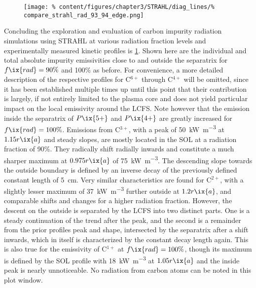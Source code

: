%
        \begin{figure}[t]%
            \centering%
                \texttt{[image: \%
                    content/figures/chapter3/STRAHL/diag\_lines/\%
                    compare\_strahl\_rad\_93\_94\_edge.png]}%
            \label{fig:total_rad_93_94_edge}%
        \end{figure}%
%
        Concluding the exploration and evaluation of carbon impurity radiation simulations using STRAHL at various radiation fraction levels and experimentally measured kinetic profiles is \cref{fig:total_rad_93_94_edge}. Shown here are the individual and total absolute impurity emissivities close to and outside the separatrix for $f\ix{rad}=90\%$ and 100\% as before. For convenience, a more detailed description of the respective profiles for C$^{6+}$ through C$^{4+}$ will be omitted, since it has been established multiple times up until this point that their contribution is largely, if not entirely limited to the plasma core and does not yield particular impact on the local emissivity around the LCFS. Note however that the emission inside the separatrix of $P\ix{5+}$ and $P\ix{4+}$ are greatly increased for $f\ix{rad}=100\%$. Emissions from C$^{3+}$, with a peak of \SI{50}{\kilo\watt\per\cubic\meter} at $1.15r\ix{a}$ and steady slopes, are mostly located in the SOL at a radiation fraction of 90\%. They radically shift radially inwards and constitute a much sharper maximum at $0.975r\ix{a}$ of \SI{75}{\kilo\watt\per\cubic\meter}. The descending slope towards the outside boundary is defined by an inverse decay of the previously defined constant length of \SI{5}{\centi\meter}. Very similar characteristics are found for C$^{2+}$, with a slightly lesser maximum of \SI{37}{\kilo\watt\per\cubic\meter} further outside at $1.2r\ix{a}$, and comparable shifts and changes for a higher radiation fraction. However, the descent on the outside is separated by the LCFS into two distinct parts. One is a steady continuation of the trend after the peak, and the second is a remainder from the prior profiles peak and shape, intersected by the separatrix after a shift inwards, which in itself is characterized by the constant decay length again. This is also true for the emissivity of C$^{1+}$ at $f\ix{rad}=100\%$, though its maximum is defined by the SOL profile with \SI{18}{\kilo\watt\per\cubic\meter} at $1.05r\ix{a}$ and the inside peak is nearly unnoticeable. No radiation from carbon atoms can be noted in this plot window. \\%
